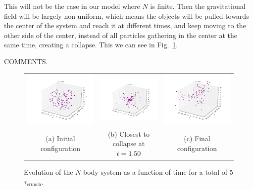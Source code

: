 \documentclass{article}
\begin{document}
\begin{multicols}{2}
This will not be the case in our model where $N$ is finite. Then the gravitational field will be largely non-uniform, which means the objects will be pulled towards the center of the system and reach it at different times, and keep moving to the other side of the center, instead of all particles gathering in the center at the same time, creating a collapse. This we can see in Fig.~\ref{fig:N_body_simulation}.

COMMENTS.

\begin{figure}
\begin{center}
\begin{tabular}{ccc}
  	\includegraphics[width=60mm]{Images/Image_100_000.png}
	& \includegraphics[width=60mm]{Images/Image_100_150.png}
	& \includegraphics[width=60mm]{Images/Image_100_495.png} \\
	(a) Initial configuration				& (b) Closest to collapse at $t = 1.50$ 	& (c) Final configuration \\[6pt]
\end{tabular}
\caption{Evolution of the $N$-body system as a function of time for a total of 5$\tau_{\mathrm{crunch}}$.}\label{fig:N_body_simulation}
\end{center}
\end{figure}



\end{multicols}
\end{document}
